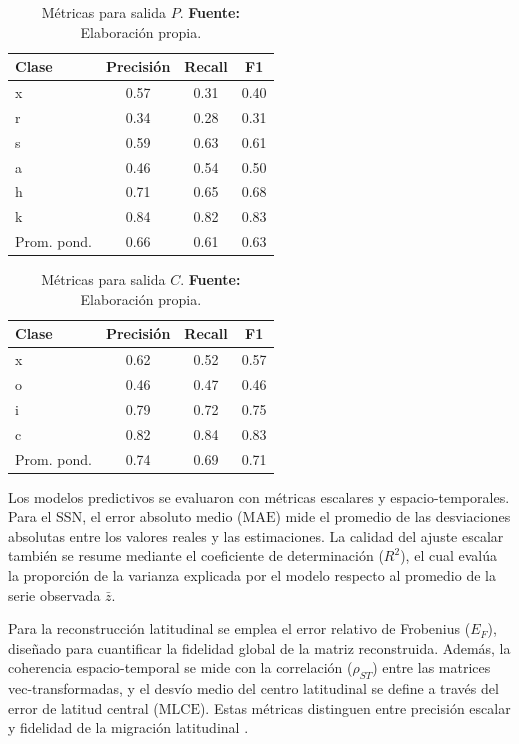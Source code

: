 \begin{table}[H]
\centering
\caption{Métricas para salida $P$. \textbf{Fuente:} Elaboración propia.}
\label{tab:resumen-metricas-p}
\begin{tabular}{lccc}
\toprule
\textbf{Clase} & \textbf{Precisión} & \textbf{Recall} & \textbf{F1} \\
\midrule
x & 0.57 & 0.31 & 0.40 \\
r & 0.34 & 0.28 & 0.31 \\
s & 0.59 & 0.63 & 0.61 \\
a & 0.46 & 0.54 & 0.50 \\
h & 0.71 & 0.65 & 0.68 \\
k & 0.84 & 0.82 & 0.83 \\
Prom. pond. & 0.66 & 0.61 & 0.63 \\
\bottomrule
\end{tabular}
\end{table}


\begin{table}[H]
\centering
\caption{Métricas para salida $C$. \textbf{Fuente:} Elaboración propia.}
\label{tab:resumen-metricas-c}
\begin{tabular}{lccc}
\toprule
\textbf{Clase} & \textbf{Precisión} & \textbf{Recall} & \textbf{F1} \\
\midrule
x & 0.62 & 0.52 & 0.57 \\
o & 0.46 & 0.47 & 0.46 \\
i & 0.79 & 0.72 & 0.75 \\
c & 0.82 & 0.84 & 0.83 \\
Prom. pond. & 0.74 & 0.69 & 0.71 \\
\bottomrule
\end{tabular}
\end{table}

Los modelos predictivos se evaluaron con métricas escalares y espacio-temporales. Para el SSN, el error absoluto medio ($\mathrm{MAE}$) mide el promedio de las desviaciones absolutas entre los valores reales y las estimaciones. La calidad del ajuste escalar también se resume mediante el coeficiente de determinación ($R^2$), el cual evalúa la proporción de la varianza explicada por el modelo respecto al promedio de la serie observada $\bar{z}$. 

Para la reconstrucción latitudinal se emplea el error relativo de Frobenius ($E_F$), diseñado para cuantificar la fidelidad global de la matriz reconstruida. Además, la coherencia espacio-temporal se mide con la correlación ($\rho_{ST}$) entre las matrices vec-transformadas, y el desvío medio del centro latitudinal se define a través del error de latitud central ($\mathrm{MLCE}$). Estas métricas distinguen entre precisión escalar y fidelidad de la migración latitudinal \citep{kalman1960newapproach,schmid2010dmd,kutz2016dmd}.


